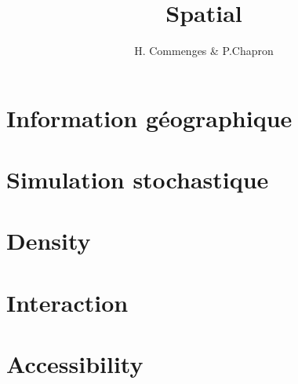 \documentclass{beamer}
\author{H. Commenges & P.Chapron}
\title{Spatial}
\date{}
\begin{document}
\section{Information géographique}

  
  
  
  
\section{Simulation stochastique}

  
  
\section{Density}

 

\section{Interaction}

  

\section{Accessibility}

 


  
\end{document}
